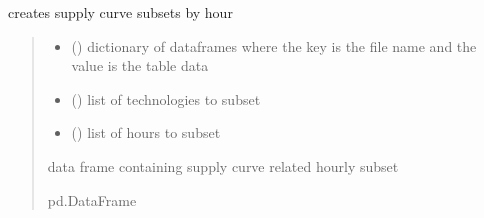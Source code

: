 \documentclass[letterpaper,10pt,english]{sphinxmanual}
\begin{document}
\begin{fulllineitems}
\label{\detokenize{src.models.electricity.scripts.preprocessor:src.models.electricity.scripts.preprocessor.hr_sub_sc_subset}}
\pysigstartsignatures
\pysiglinewithargsret
{}
{\sphinxparamcomma {}\sphinxparamcomma {}}
{}
\pysigstopsignatures
\sphinxAtStartPar
creates supply curve subsets by hour
\begin{quote}\begin{description}
\begin{itemize}
\item {} 
\sphinxAtStartPar
{} () \textendash{} dictionary of dataframes where the key is the file name and the value is the table data

\item {} 
\sphinxAtStartPar
{} () \textendash{} list of technologies to subset

\item {} 
\sphinxAtStartPar
{} () \textendash{} list of hours to subset

\end{itemize}

\sphinxAtStartPar
data frame containing supply curve related hourly subset

\sphinxAtStartPar
pd.DataFrame

\end{description}\end{quote}

\end{fulllineitems}

\end{document}
